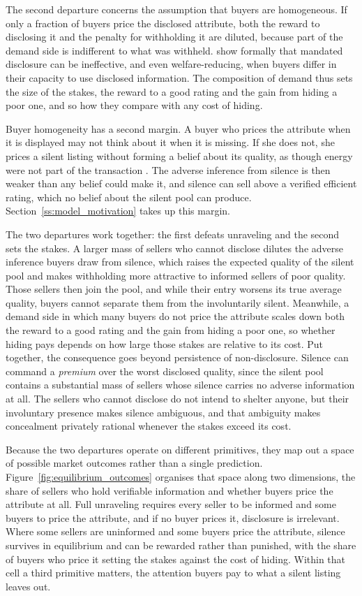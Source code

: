 The second departure concerns the assumption that buyers are homogeneous. If only a fraction of buyers price the disclosed
attribute, both the reward to disclosing it and the penalty for withholding it are diluted, because
part of the demand side is indifferent to what was withheld. \citet{fishman_mandatory_2003} show formally that mandated
disclosure can be ineffective, and even welfare-reducing, when buyers differ in their capacity to
use disclosed information. The composition of demand thus sets the size of the stakes, the reward to a good rating and the
gain from hiding a poor one, and so how they compare with any cost of hiding.

Buyer homogeneity has a second margin. A buyer who prices the attribute when it is displayed may not think about it when it is missing. If she does not, she prices a silent listing without forming a belief about its quality, as though energy were not part of the transaction \citep{hirshleifer_limited_2003, dellavigna_investor_2009}. The adverse inference from silence is then weaker than any belief could make it, and silence can sell above a verified efficient rating, which no belief about the silent pool can produce. Section~\ref{ss:model_motivation} takes up this margin.

The two departures work together: the first defeats unraveling and the second sets the stakes. A larger mass of sellers who cannot
disclose dilutes the adverse inference buyers draw from silence, which raises the expected quality
of the silent pool and makes withholding more attractive to informed sellers of poor quality.
Those sellers then join the pool, and while their entry worsens its true average quality, buyers
cannot separate them from the involuntarily silent. Meanwhile, a demand side in which many buyers
do not price the attribute scales down both the reward to a good rating and the gain from hiding a
poor one, so whether hiding pays depends on how large those stakes are relative to its cost. Put together,
the consequence goes beyond persistence of non-disclosure. Silence can command a
\emph{premium} over the worst disclosed quality, since the silent pool contains a substantial
mass of sellers whose silence carries no adverse information at all. The sellers who cannot
disclose do not intend to shelter anyone, but their involuntary presence makes silence ambiguous,
and that ambiguity makes concealment privately rational whenever the stakes exceed its cost.

Because the two departures operate on different primitives, they map out a space of possible
market outcomes rather than a single prediction. Figure~\ref{fig:equilibrium_outcomes} organises
that space along two dimensions, the share of sellers who hold verifiable information and whether
buyers price the attribute at all. Full unraveling requires every seller to be informed and some
buyers to price the attribute, and if no buyer prices it, disclosure is irrelevant. Where some
sellers are uninformed and some buyers price the attribute, silence survives in equilibrium and can
be rewarded rather than punished, with the share of buyers who price it setting the stakes against
the cost of hiding. Within that cell a third primitive matters, the attention buyers pay to what a silent listing leaves out.

